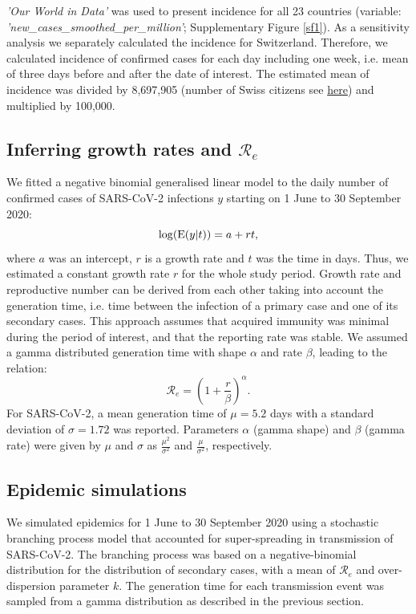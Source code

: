 \documentclass[10pt, a4paper, twoside]{article}
\begin{document}
\begin{multicols}{2}
\textit{'Our World in Data'} was used to present incidence for all 23 countries (variable: \textit{'new\_cases\_smoothed\_per\_million'}; Supplementary Figure \ref{sf1}).\cite{hasell_cross-country_2020}
As a sensitivity analysis we separately calculated the incidence for Switzerland.%
Therefore, we calculated incidence of confirmed cases for each day including one week, i.e. mean of three days before and after the date of interest.
The estimated mean of incidence was divided by 8,697,905 (number of Swiss citizens see \href{https://www.worldometers.info/world-population/switzerland-population/}{here}) and multiplied by 100,000.


\subsection{Inferring growth rates and $\mathcal{R}_e$}\label{marker}
We fitted a negative binomial generalised linear model to the daily number of confirmed cases of SARS-CoV-2 infections $y$ starting on 1 June to 30 September 2020:
\begin{equation}
	\log(\text E(y|t)) = a + r t,
\end{equation}
where $a$ was an intercept, $r$ is a growth rate and $t$ was the time in days.
Thus, we estimated a constant growth rate $r$ for the whole study period.
Growth rate and reproductive number can be derived from each other taking into account the generation time, i.e. time between the infection of a primary case and one of its secondary cases.\cite{wallinga_how_2007,krauer_heterogeneity_2016,svensson_note_2007}
This approach assumes that acquired immunity was minimal during the period of interest, and that  the reporting rate was stable.
We assumed a gamma distributed generation time with shape $\alpha$ and rate $\beta$, leading to the relation:
\begin{equation}
	\mathcal{R}_e = (1 + \frac{r}{\beta} )^\alpha.
\end{equation}
For SARS-CoV-2, a mean generation time of $\mu= 5.2$ days with a standard deviation of $\sigma = 1.72$ was reported.\cite{ganyani_estimating_2020}
Parameters $\alpha$ (gamma shape) and $\beta$ (gamma rate) were given by $\mu$ and $\sigma$ as $\frac{\mu^2}{\sigma^2 }$ and $\frac{\mu}{\sigma^2}$, respectively.

\subsection{Epidemic simulations}
We simulated epidemics for 1 June to 30 September 2020 using a stochastic branching process model that accounted for super-spreading in transmission of SARS-CoV-2.\cite{riou_pattern_2020}
The branching process was based on a negative-binomial distribution for the distribution of secondary cases, with a mean of $\mathcal{R}_e$ and over-dispersion parameter $k$.
The generation time for each transmission event was sampled from a gamma distribution as described in the previous section.


\end{multicols}
\end{document}
